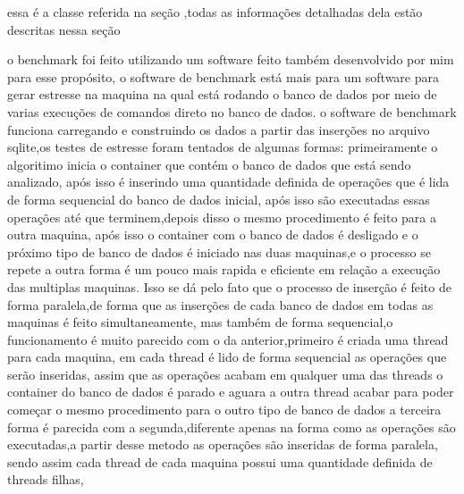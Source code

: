 \documentclass[
	12pt,				%
	openright,			%
	oneside,			%
	a4paper,			%
	english,			%
	french,				%
	spanish,			%
	brazil,				%
	]{abntex2}
\begin{document}
essa é a classe referida na seção ,todas as informações detalhadas dela estão descritas nessa seção

o benchmark foi feito utilizando um software feito também desenvolvido por mim para esse propósito,
o software de benchmark está mais para um software para gerar estresse na maquina na qual está rodando o banco de dados por meio de varias execuções de comandos direto no banco de dados.
o software de benchmark funciona carregando e construindo os dados a partir das inserções no arquivo sqlite,os testes de estresse foram tentados de algumas formas:\newline
primeiramente o algoritimo inicia o container que contém o banco de dados que está sendo analizado,
após isso é inserindo uma quantidade definida de operações que é lida de forma sequencial do banco de dados inicial,
após isso são executadas essas operações até que terminem,depois disso o mesmo procedimento é feito para a outra maquina,
após isso o container com o banco de dados é desligado e o próximo tipo de banco de dados é iniciado nas duas maquinas,e o processo se repete\newline
a outra forma é um pouco mais rapida e eficiente em relação a execução das multiplas maquinas.
Isso se dá pelo fato que o processo de inserção é feito de forma paralela,de forma que as inserções de cada banco de dados em todas as maquinas é feito simultaneamente,
mas também de forma sequencial,o funcionamento é muito parecido com o da anterior,primeiro é criada uma thread para cada maquina,
em cada thread é lido de forma sequencial as operações que serão inseridas,
assim que as operações acabam em qualquer uma das threads o container do banco de dados é parado e aguara a outra thread acabar para poder começar o mesmo procedimento para o outro tipo de banco de dados\newline
a terceira forma é parecida com a segunda,diferente apenas na forma como as operações são executadas,a partir desse metodo as operações são inseridas de forma paralela,
sendo assim cada thread de cada maquina possui uma quantidade definida de threads filhas,
\end{document}
